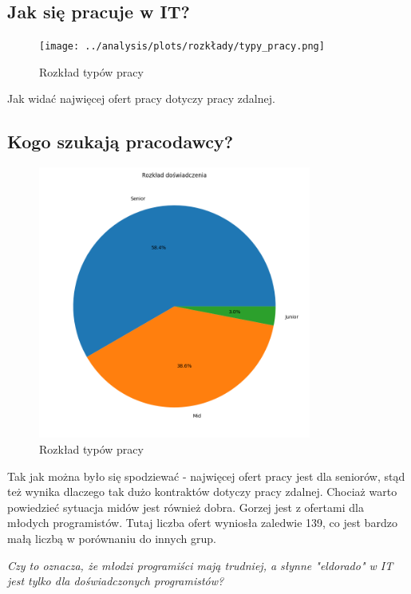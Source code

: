 \documentclass[a4paper]{article}
\begin{document}
\subsection{Jak się pracuje w IT?}

\begin{figure}[H]
    \centering
    \texttt{[image: ../analysis/plots/rozkłady/typy\_pracy.png]}
    \caption{Rozkład typów pracy}
\end{figure}

\quad Jak widać najwięcej ofert pracy dotyczy pracy zdalnej.


\subsection{Kogo szukają pracodawcy?}

\begin{figure}[H]
    \centering
    \includegraphics[width=0.8\textwidth]{../analysis/plots/rozkłady/rozkład_doświadczenia.png}
    \caption{Rozkład typów pracy}
\end{figure}

\quad Tak jak można było się spodziewać - najwięcej ofert pracy jest dla seniorów,
stąd też wynika dlaczego tak dużo kontraktów dotyczy pracy zdalnej. Chociaż
warto powiedzieć sytuacja midów jest również dobra. Gorzej jest z ofertami dla młodych programistów.
Tutaj liczba ofert wyniosła zaledwie 139, co jest bardzo małą liczbą w porównaniu do innych grup.

\textit{Czy to oznacza, że młodzi programiści mają trudniej, a słynne "eldorado" w IT jest tylko dla doświadczonych programistów?}
\end{document}
